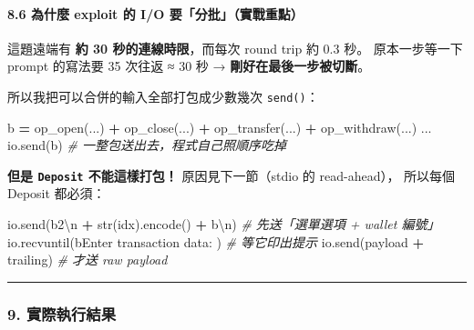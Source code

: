 \documentclass[10pt,a4paper]{article}
\newenvironment{Shaded}{\begin{snugshade}}{\end{snugshade}}
\newcommand{\BuiltInTok}[1]{#1}
\newcommand{\CharTok}[1]{\textcolor[rgb]{0.31,0.60,0.02}{#1}}
\newcommand{\CommentTok}[1]{\textcolor[rgb]{0.56,0.35,0.01}{\textit{#1}}}
\newcommand{\NormalTok}[1]{#1}
\newcommand{\OperatorTok}[1]{\textcolor[rgb]{0.81,0.36,0.00}{\textbf{#1}}}
\newcommand{\StringTok}[1]{\textcolor[rgb]{0.31,0.60,0.02}{#1}}
\renewenvironment{Shaded}{%
  \def\FrameCommand{\fboxsep=3.2pt\colorbox{shadecolor}}%
  \MakeFramed{\advance\hsize-\width\FrameRestore\small}%
}{%
  \endMakeFramed
}
\begin{document}
\paragraph{8.6 為什麼 exploit 的 I/O
要「分批」（實戰重點）}\label{ux70baux4ec0ux9ebc-exploit-ux7684-io-ux8981ux5206ux6279ux5be6ux6230ux91cdux9ede}

這題遠端有 \textbf{約 30 秒的連線時限}，而每次 round trip 約 0.3 秒。
原本一步等一下 prompt 的寫法要 35 次往返 ≈ 30 秒 →
\textbf{剛好在最後一步被切斷}。

所以我把可以合併的輸入全部打包成少數幾次 \texttt{send()}：

\begin{Shaded}
\begin{Highlighting}[]
\NormalTok{b  }\OperatorTok{=}\NormalTok{ op\_open(...) }\OperatorTok{+}\NormalTok{ op\_close(...) }\OperatorTok{+}\NormalTok{ op\_transfer(...) }\OperatorTok{+}\NormalTok{ op\_withdraw(...) ...}
\NormalTok{io.send(b)        }\CommentTok{\# 一整包送出去，程式自己照順序吃掉}
\end{Highlighting}
\end{Shaded}

\textbf{但是 \texttt{Deposit} 不能這樣打包！} 原因見下一節（stdio 的
read-ahead）， 所以每個 Deposit 都必須：

\begin{Shaded}
\begin{Highlighting}[]
\NormalTok{io.send(}\StringTok{b\textquotesingle{}2}\CharTok{\textbackslash{}n}\StringTok{\textquotesingle{}} \OperatorTok{+} \BuiltInTok{str}\NormalTok{(idx).encode() }\OperatorTok{+} \StringTok{b\textquotesingle{}}\CharTok{\textbackslash{}n}\StringTok{\textquotesingle{}}\NormalTok{)   }\CommentTok{\# 先送「選單選項 + wallet 編號」}
\NormalTok{io.recvuntil(}\StringTok{b\textquotesingle{}Enter transaction data: \textquotesingle{}}\NormalTok{)     }\CommentTok{\# 等它印出提示}
\NormalTok{io.send(payload }\OperatorTok{+}\NormalTok{ trailing)                   }\CommentTok{\# 才送 raw payload}
\end{Highlighting}
\end{Shaded}

\begin{center}\rule{0.5\linewidth}{0.5pt}\end{center}

\subsubsection{9.
實際執行結果}\label{ux5be6ux969bux57f7ux884cux7d50ux679c-3}
\end{document}
